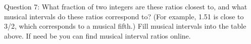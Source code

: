 \documentclass[11pt]{NSF}
\begin{document}
Question 7: \hspace{.5cm}  What fraction of two integers are these ratios closest to,
and what musical intervals do these ratios correspond to?
(For example, 1.51 is close to 3/2, which corresponds to a musical 
fifth.) Fill musical intervals into the table above. If need be you can find musical interval ratios online. 
\end{document}
